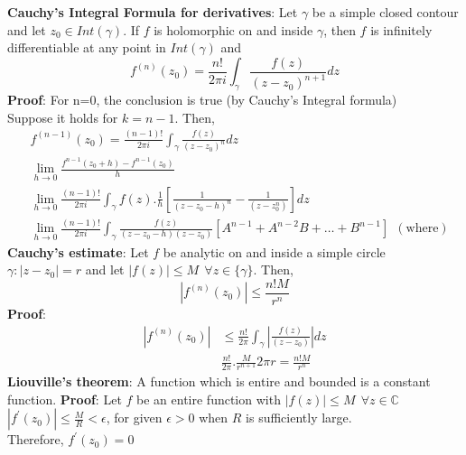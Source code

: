 \documentclass{article}
\begin{document}
\begin{flushleft}
\textbf{Cauchy's Integral Formula for derivatives}: Let $\gamma$ be a simple closed contour and let $z_0\in Int(\gamma)$. If $f$ is holomorphic on and inside $\gamma$, then $f$ is infinitely differentiable at any point in $Int(\gamma)$ and\\
\begin{equation*}
    f^{(n)}(z_0)=\frac{n!}{2\pi i}\int_{\gamma}^{}\frac{f(z)}{(z-z_0)^{n+1}} dz
\end{equation*}
\textbf{Proof}: For n=0, the conclusion is true (by Cauchy's Integral formula)\\
Suppose it holds for $k=n-1$. Then,\\
\begin{equation*}
    \begin{split}
    &f^{(n-1)}(z_0)=\frac{(n-1)!}{2\pi i}\int_{\gamma}^{}\frac{f(z)}{(z-z_0)^n} dz\\
    &\lim_{h \to 0} \frac{f^{n-1}(z_0+h)-f^{n-1}(z_0)}{h}\\
    &\lim_{h \to 0} \frac{(n-1)!}{2\pi i}\int_{\gamma}^{} f(z).\frac{1}{h}[\frac{1}{(z-z_0-h)^n}-\frac{1}{(z-z_0^n)}] dz\\
    &\lim_{h \to 0} \frac{(n-1)!}{2\pi i}\int_{\gamma}^{} \frac{f(z)}{(z-z_0-h)(z-z_0)}[A^{n-1}+A^{n-2}B+\dots +B^{n-1}] \:\:(\text{where})
    \end{split}
\end{equation*}
\textbf{Cauchy's estimate}: Let $f$ be analytic on and inside a simple circle $\gamma: |z-z_0|=r$ and let $|f(z)|\leq M \:\:\forall z\in \{\gamma\}$. Then,\\
\begin{equation*}
    |f^{(n)}(z_0)|\leq \frac{n!M}{r^n}
\end{equation*}
\textbf{Proof}: \begin{equation*}
    \begin{split}
        |f^{(n)}(z_0)|&\leq \frac{n!}{2\pi}\int_{\gamma}^{} |\frac{f(z)}{(z-z_0)}| dz \\
        & \frac{n!}{2\pi}.\frac{M}{r^{n+1}}2\pi r=\frac{n!M}{r^n}
    \end{split}
\end{equation*}
\textbf{Liouville's theorem}: A function which is entire and bounded is a constant function.
\textbf{Proof}: Let $f$ be an entire function with $|f(z)|\leq M \:\:\forall z\in\mathds{C}$\\
$|f^{'}(z_0)|\leq \frac{M}{R} < \epsilon$, for given $\epsilon>0$ when $R$ is sufficiently large.\\
Therefore, $f^{'}(z_0)=0$\\

\end{flushleft}
\end{document}
